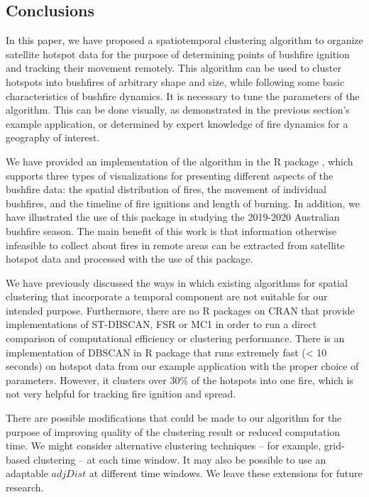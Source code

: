 \hypertarget{conclusions}{%
\subsection{Conclusions}\label{conclusions}}

In this paper, we have proposed a spatiotemporal clustering algorithm to organize satellite hotspot data for the purpose of determining points of bushfire ignition and tracking their movement remotely. This algorithm can be used to cluster hotspots into bushfires of arbitrary shape and size, while following some basic characteristics of bushfire dynamics. It is necessary to tune the parameters of the algorithm. This can be done visually, as demonstrated in the previous section's example application, or determined by expert knowledge of fire dynamics for a geography of interest.

We have provided an implementation of the algorithm in the R package , which supports three types of visualizations for presenting different aspects of the bushfire data: the spatial distribution of fires, the movement of individual bushfires, and the timeline of fire ignitions and length of burning. In addition, we have illustrated the use of this package in studying the 2019-2020 Australian bushfire season. The main benefit of this work is that information otherwise infeasible to collect about fires in remote areas can be extracted from satellite hotspot data and processed with the use of this package.

We have previously discussed the ways in which existing algorithms for spatial clustering that incorporate a temporal component are not suitable for our intended purpose. Furthermore, there are no R packages on CRAN that provide implementations of ST-DBSCAN, FSR or MC1 in order to run a direct comparison of computational efficiency or clustering performance. There is an implementation of DBSCAN in R package  that runs extremely fast (\textless{} 10 seconds) on hotspot data from our example application with the proper choice of parameters. However, it clusters over 30\% of the hotspots into one fire, which is not very helpful for tracking fire ignition and spread.

There are possible modifications that could be made to our algorithm for the purpose of improving quality of the clustering result or reduced computation time. We might consider alternative clustering techniques -- for example, grid-based clustering -- at each time window. It may also be possible to use an adaptable \(adjDist\) at different time windows. We leave these extensions for future research.

